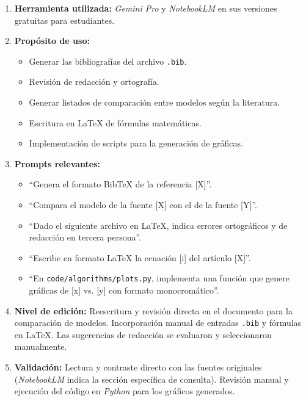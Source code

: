\begin{enumerate} 
\item \textbf{Herramienta utilizada:} \textit{Gemini Pro} y \textit{NotebookLM} en sus versiones gratuitas para estudiantes.
\item \textbf{Propósito de uso:} 

\begin{itemize}
\item Generar las bibliografías del archivo \texttt{.bib}.
\item Revisión de redacción y ortografía. 
\item Generar listados de comparación entre modelos según la literatura. 
\item Escritura en \LaTeX{} de fórmulas matemáticas.
\item Implementación de scripts para la generación de gráficas.
\end{itemize}

\item \textbf{Prompts relevantes:} 

\begin{itemize}
\item ``Genera el formato BibTeX de la referencia [X]''.
\item ``Compara el modelo de la fuente [X] con el de la fuente [Y]''.
\item ``Dado el siguiente archivo en \LaTeX{}, indica errores ortográficos y de redacción en tercera persona''.
\item ``Escribe en formato \LaTeX{} la ecuación [i] del artículo [X]''.
\item ``En \texttt{code/algorithms/plots.py}, implementa una función que genere gráficas de [x] vs. [y] con formato monocromático''.
\end{itemize}

\item \textbf{Nivel de edición:} Reescritura y revisión directa en el documento para la comparación de modelos. Incorporación manual de entradas \texttt{.bib} y fórmulas en \LaTeX{}. Las sugerencias de redacción se evaluaron y seleccionaron manualmente.

\item \textbf{Validación:} Lectura y contraste directo con las fuentes originales (\textit{NotebookLM} indica la sección específica de consulta). Revisión manual y ejecución del código en \textit{Python} para los gráficos generados.

\end{enumerate}


